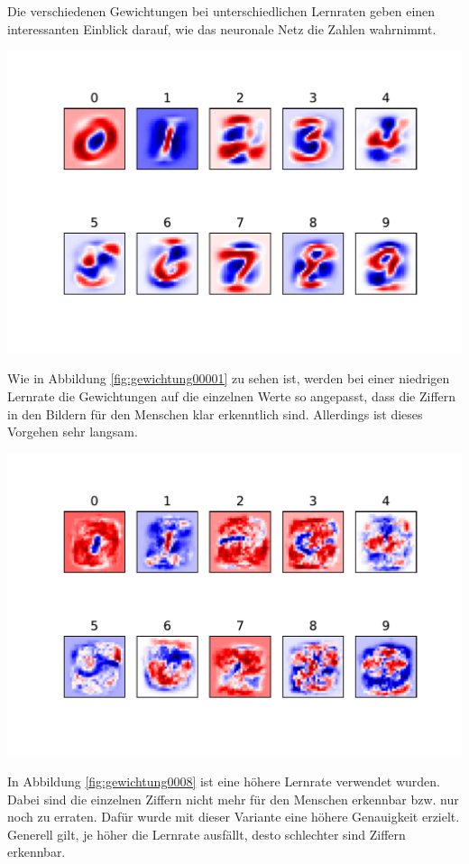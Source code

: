 Die verschiedenen Gewichtungen bei unterschiedlichen Lernraten geben einen interessanten Einblick darauf, wie das neuronale Netz die Zahlen wahrnimmt.
\begin{center}
	\includegraphics[width=.6\textwidth]{../abbildungen/weightPlot00001.pdf}
	\label{fig:gewichtung00001}
\end{center}

Wie in Abbildung \ref{fig:gewichtung00001} zu sehen ist, werden bei einer niedrigen Lernrate die Gewichtungen auf die einzelnen Werte so angepasst, dass die Ziffern in den Bildern für den Menschen klar erkenntlich sind. Allerdings ist dieses Vorgehen sehr langsam.

\begin{center}
	\includegraphics[width=.6\textwidth]{../abbildungen/weightPlot0008.pdf}
	\label{fig:gewichtung0008}
\end{center}

In Abbildung \ref{fig:gewichtung0008} ist eine höhere Lernrate verwendet wurden. Dabei sind die einzelnen Ziffern nicht mehr für den Menschen erkennbar bzw. nur noch zu erraten. Dafür wurde mit dieser Variante eine höhere Genauigkeit erzielt. Generell gilt, je höher die Lernrate ausfällt, desto schlechter sind Ziffern erkennbar.

